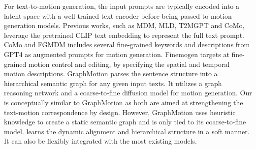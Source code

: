 For text-to-motion generation, the input prompts are typically encoded into a latent space with a well-trained text encoder before being passed to motion generation models. 
Previous works, such as MDM, MLD, T2MGPT and CoMo, leverage the pretrained CLIP text embedding to represent the full text prompt.
CoMo \cite{huang2024como} and FGMDM \cite{shi2023generating} includes several fine-grained keywords and descriptions from GPT4 \cite{openai2024gpt4technicalreport} as augmented prompts for motion generation.
Finemogen \cite{zhang2023finemogen} targets at fine-grained motion control and editing, by specifying the spatial and temporal motion descriptions.
GraphMotion \cite{jin2023act} parses the sentence structure into a hierarchical semantic graph for any given input texts. 
It utilizes a graph reasoning network and a coarse-to-fine diffusion model for motion generation.
Our {\modulename} is conceptually similar to GraphMotion as both are aimed at strengthening the text-motion correspondence by design. 
However, GraphMotion uses heuristic knowledge to create a static semantic graph and is only tied to its coarse-to-fine model.
{\modulename} learns the dynamic alignment and hierarchical structure in a soft manner. 
It can also be flexibly integrated with the most existing models.



